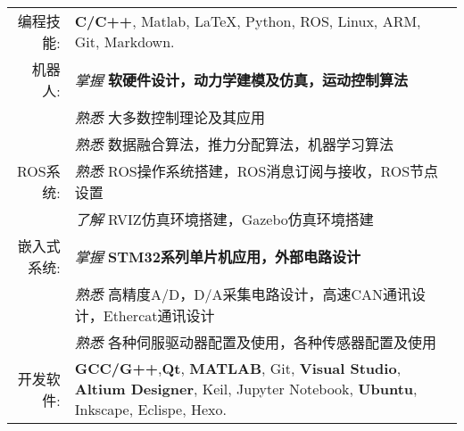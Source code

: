 %
%


 
\renewcommand{\arraystretch}{1.1}

	\begin{tabular}{>{}r>{}p{13cm}} 
		\textsc{编程技能:}      &  \textbf{C/C++}, Matlab, \LaTeX, Python, ROS, Linux, ARM, Git, Markdown.\\  
		\textsc{机器人:} 		&  \emph{掌握} \textbf{软硬件设计，动力学建模及仿真，运动控制算法} \\
							   &  \emph{熟悉}   大多数控制理论及其应用 \\
							   &  \emph{熟悉}   数据融合算法，推力分配算法，机器学习算法 \\
		\textsc{ROS系统:}	   &  \emph{熟悉}  ROS操作系统搭建，ROS消息订阅与接收，ROS节点设置  \\
							&  \emph{了解} RVIZ仿真环境搭建，Gazebo仿真环境搭建\\
		\textsc{嵌入式系统:}  &  \emph{掌握} \textbf{STM32系列单片机应用，外部电路设计} \\
						    &  \emph{熟悉} 高精度A/D，D/A采集电路设计，高速CAN通讯设计，Ethercat通讯设计 \\
						    &  \emph{熟悉} 各种伺服驱动器配置及使用，各种传感器配置及使用 \\
		\textsc{开发软件:}	    & \textbf{GCC/G++},\textbf{Qt}, \textbf{MATLAB}, Git, \textbf{Visual Studio}, \textbf{Altium Designer}, Keil, Jupyter Notebook, \textbf{Ubuntu}, Inkscape, Eclispe, Hexo.\\
	\end{tabular}
	
